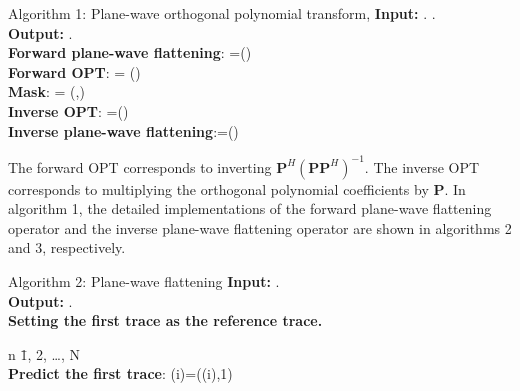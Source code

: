 
\begin{algorithm}{Algorithm 1: Plane-wave orthogonal polynomial transform}{,\tau}
     \textbf{Input:}  .  \tau. \\
     \textbf{Output:}  . \\
     \textbf{Forward plane-wave flattening}: =() \\
     \textbf{Forward OPT}:  = () \\
     \textbf{Mask}:    = (,\tau)\\
     \textbf{Inverse OPT}: =()\\
     \textbf{Inverse plane-wave flattening}:=()
\end{algorithm}


The forward OPT corresponds to inverting $\mathbf{P}^H(\mathbf{P}\mathbf{P}^H)^{-1}$. The inverse OPT corresponds to multiplying the orthogonal polynomial coefficients by $\mathbf{P}$. In algorithm 1, the detailed implementations of the forward plane-wave flattening operator and the inverse plane-wave flattening operator are shown in algorithms 2 and 3, respectively.

\begin{algorithm}{Algorithm 2: Plane-wave flattening}{}
 \textbf{Input:}  . \\
 \textbf{Output:}  . \\
 \textbf{Setting the first trace as the reference trace.} \\
    \begin{FOR}{n \= 1, 2, \ldots, N} \\
    \textbf{Predict the first trace}: (i)=((i),1)  
    \end{FOR}
\end{algorithm}


